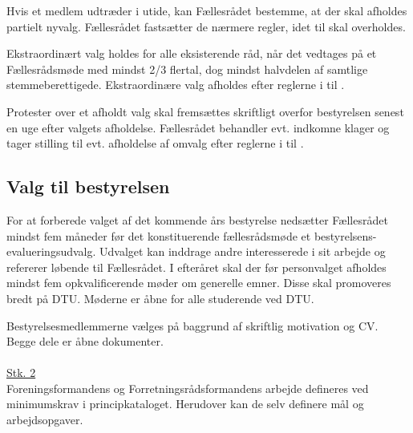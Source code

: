 \begin{list}
\item Hvis et medlem udtræder i utide, kan Fællesrådet bestemme, at der skal afholdes partielt nyvalg. Fællesrådet fastsætter de nærmere regler, idet  til  skal overholdes.\\

\item Ekstraordinært valg holdes for alle eksisterende råd, når det vedtages på et Fællesrådsmøde med mindst 2/3 flertal, dog mindst halvdelen af samtlige stemmeberettigede. Ekstraordinære valg afholdes efter reglerne i  til .

\item Protester over et afholdt valg skal fremsættes skriftligt overfor bestyrelsen senest en uge efter valgets afholdelse. Fællesrådet behandler evt. indkomne klager og tager stilling til evt. afholdelse af omvalg efter reglerne i  til .


\subsection{Valg til bestyrelsen} \label{kap:ValgTilBestyrelsen}
\item For at forberede valget af det kommende års bestyrelse nedsætter Fællesrådet mindst fem måneder før det konstituerende fællesrådsmøde et bestyrelsens-evalueringsudvalg. Udvalget kan inddrage andre interesserede i sit arbejde og refererer løbende til Fællesrådet. I efteråret skal der før personvalget afholdes mindst fem opkvalificerende møder om generelle emner. Disse skal promoveres bredt på DTU. Møderne er åbne for alle studerende ved DTU.

\item Bestyrelsesmedlemmerne vælges på baggrund af skriftlig motivation og CV. Begge dele er åbne dokumenter.\\
\\
\underline{Stk. 2}\\
Foreningsformandens og Forretningsrådsformandens arbejde defineres ved minimumskrav i principkataloget. Herudover kan de selv definere mål og arbejdsopgaver.\\


\end{list}
